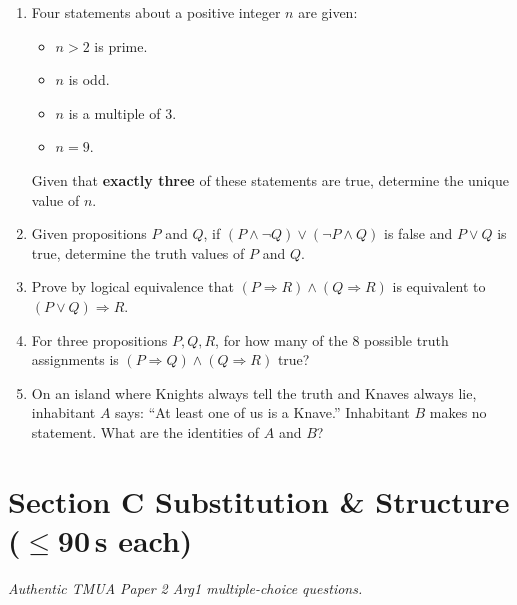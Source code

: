 \documentclass[11pt,a4paper]{article}
\begin{document}
\begin{enumerate}
\item Four statements about a positive integer $n$ are given:
\begin{itemize}
\item[$S_1$:] $n > 2$ is prime.
\item[$S_2$:] $n$ is odd.
\item[$S_3$:] $n$ is a multiple of $3$.
\item[$S_4$:] $n = 9$.
\end{itemize}
Given that \textbf{exactly three} of these statements are true, determine the unique value of $n$.

\item Given propositions $P$ and $Q$, if $(P \land \neg Q) \lor (\neg P \land Q)$ is false and $P \lor Q$ is true, determine the truth values of $P$ and $Q$.

\item Prove by logical equivalence that $(P \Rightarrow R) \land (Q \Rightarrow R)$ is equivalent to $(P \lor Q) \Rightarrow R$.

\item For three propositions $P, Q, R$, for how many of the $8$ possible truth assignments is $(P \Rightarrow Q) \land (Q \Rightarrow R)$ true?

\item On an island where Knights always tell the truth and Knaves always lie, inhabitant $A$ says: ``At least one of us is a Knave.'' Inhabitant $B$ makes no statement. What are the identities of $A$ and $B$?

\end{enumerate}

\section*{Section C \quad Substitution \& Structure \hfill{\normalfont\small($\leq$90\,s each)}}

\noindent\textit{Authentic TMUA Paper 2 Arg1 multiple-choice questions.}
\end{document}
